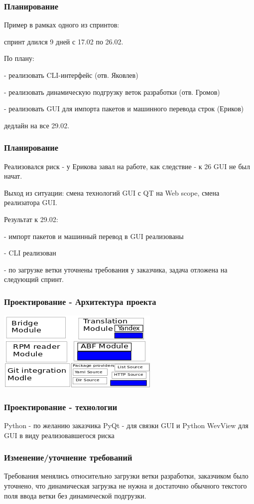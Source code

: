 \documentclass{beamer}
\begin{document}
\begin{frame}
\frametitle{Планирование}

Пример в рамках одного из спринтов:

спринт длился 9 дней с 17.02 по 26.02. 

По плану:

- реализовать CLI-интерфейс (отв. Яковлев)

- реализовать динамическую подгрузку веток разработки (отв. Громов)

- реализовать GUI для импорта пакетов и машинного перевода строк (Ериков)

дедлайн на все 29.02.
\end{frame}
\begin{frame}
\frametitle{Планирование}

Реализовался риск - у Ерикова завал на работе, как следствие - к 26 GUI не был начат.

Выход из ситуации: смена технологий GUI с QT на Web scope, смена реализатора GUI.

Результат к 29.02:

- импорт пакетов и машинный перевод в GUI реализованы 

- CLI реализован

- по загрузке ветки уточнены требования у заказчика, задача отложена на следующий спринт.
\end{frame}
\begin{frame}
\frametitle{Проектирование - Архитектура проекта}

\includegraphics{diagram.png}
\end{frame}
\begin{frame}
\frametitle{Проектирование - технологии}

Python - по желанию заказчика
PyQt - для связки GUI и Python
WevView для GUI в виду реализовавшегося риска
\end{frame}
\begin{frame}
\frametitle{Изменение/уточнение требований}

Требования менялись относительно загрузки ветки разработки, заказчиком было уточнено, что динамическая загрузка не 
нужна и достаточно обычного текстого поля ввода ветки без динамической подгрузки.
\end{frame}
\end{document}
